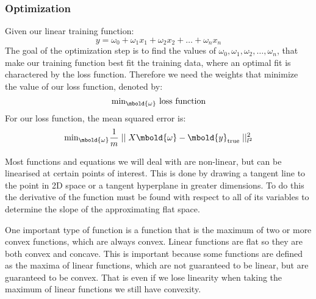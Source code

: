 \documentclass[12pt letter]{report}
\begin{document}
\subsubsection{Optimization}


Given our linear training function:
\[
  y = \omega_0 + \omega_1 x_1 + \omega_2 x_2 + \ldots + \omega_n x_n
\]
The goal of the optimization step is to find the values of $\omega_0, \omega_1, \omega_2, \ldots, \omega_n$, that make
our training function best fit the training data, where an optimal fit is charactered by the loss function. Therefore we
need the weights that minimize the value of our loss function, denoted by:
\[
  \text{min}_{\mbold{\omega}} \text{ loss function}
\]
For our loss function, the mean squared error is:
\[
  \text{min}_{\mbold{\omega}} \frac{1}{m}  \mid  \mid X \mbold{\omega} - \mbold{y}_{\text{true}}  \mid  \mid_{l^2}^2
\]




Most functions and equations we will deal with are non-linear, but can be linearised at certain points of interest. This
is done by drawing a tangent line to the point in 2D space or a tangent hyperplane in greater dimensions. To do this the
derivative of the function must be found with respect to all of its variables to determine the slope of the
approximating flat space.

One important type of function is a function that is the maximum of two or more convex functions, which are always
convex. Linear functions are flat so they are both convex and concave. This is important because some functions are
defined as the maxima of linear functions, which are not guaranteed to be linear, but are guaranteed to be convex. That
is even if we lose linearity when taking the maximum of linear functions we still have convexity.
\end{document}
